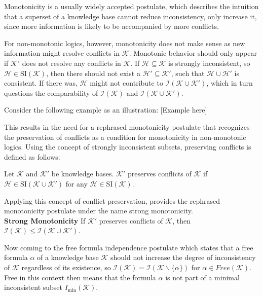 Monotonicity is a usually widely accepted postulate, which describes the intuition that a superset of a knowledge base cannot reduce inconsistency, only increase it, since more information is likely to be accompanied by more conflicts.

For non-monotonic logics, however, monotonicity does not make sense as new information might resolve conflicts in \(\mathcal{K}\). Monotonic behavior should only appear if \(\mathcal{K}'\) does not resolve any conflicts in \(\mathcal{K}\). If \(\mathcal{H} \subseteq \mathcal{K}\) is strongly inconsistent, so \(\mathcal{H} \in \text{SI}(\mathcal{K})\), then there should not exist a \(\mathcal{H}' \subseteq \mathcal{K}'\), such that \(\mathcal{H} \cup \mathcal{H}'\) is consistent. If there was, \(\mathcal{H}\) might not contribute to \(\mathcal{I}(\mathcal{K} \cup \mathcal{K}')\), which in turn questions the comparability of \(\mathcal{I}(\mathcal{K})\) and \(\mathcal{I}(\mathcal{K} \cup \mathcal{K}')\).


Consider the following example as an illustration:
[Example here]

This results in the need for a rephrased monotonicity postulate that recognizes the preservation of conflicts as a condition for monotonicity in non-monotonic logics. Using the concept of strongly inconsistent subsets, preserving conflicts is defined as follows:

\begin{definition}
    Let \(\mathcal{K}\) and \(\mathcal{K}'\) be knowledge bases. \(\mathcal{K}'\) preserves conflicts of \(\mathcal{K}\) if \(\mathcal{H} \in \text{SI}(\mathcal{K} \cup \mathcal{K}')\) for any \(\mathcal{H} \in \text{SI}(\mathcal{K})\).
\end{definition}

Applying this concept of conflict preservation, \cite{ulbricht_handling_2020} provides the rephrased monotonicity postulate under the name strong monotonicity.
\\
\textbf{Strong Monotonicity}
If \(\mathcal{K}'\) preserves conflicts of \(\mathcal{K}\), then \(\mathcal{I}(\mathcal{K}) \leq \mathcal{I}(\mathcal{K \cup \mathcal{K}'})\).

Now coming to the free formula independence postulate which states that a free formula \(\alpha\) of a knowledge base \(\mathcal{K}\) should not increase the degree of inconsistency of \(\mathcal{K}\) regardless of its existence, so \(\mathcal{I}(\mathcal{K}) = \mathcal{I}(\mathcal{K} \backslash \{\alpha\})\) for \(\alpha \in Free(\mathcal{K})\). Free in this context then means that the formula \(\alpha\) is not part of a minimal inconsistent subset \(I_{\min}(\mathcal{K})\).

